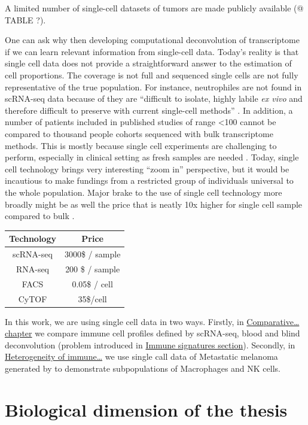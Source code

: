 \documentclass[12pt,]{book}
\theoremstyle{definition}
\theoremstyle{definition}
\theoremstyle{definition}
\theoremstyle{remark}
\begin{document}
A limited number of single-cell datasets of tumors are made publicly
available (@ TABLE ?).

One can ask why then developing computational deconvolution of
transcriptome if we can learn relevant information from single-cell
data. Today's reality is that single cell data does not provide a
straightforward answer to the estimation of cell proportions. The
coverage is not full and sequenced single cells are not fully
representative of the true population. For instance, neutrophiles are
not found in scRNA-seq data because of they are ``difficult to isolate,
highly labile \emph{ex vivo} and therefore difficult to preserve with
current single-cell methods'' \citep{Schelker2017}. In addition, a
number of patients included in published studies of range \textless{}100
cannot be compared to thousand people cohorts sequenced with bulk
transcriptome methods. This is mostly because single cell experiments
are challenging to perform, especially in clinical setting as fresh
samples are needed \citep{Schelker2017}. Today, single cell technology
brings very interesting ``zoom in'' perspective, but it would be
incautious to make fundings from a restricted group of individuals
universal to the whole population. Major brake to the use of single cell
technology more broadly might be as well the price that is neatly 10x
higher for single cell sample compared to bulk \citep{Cedar2018}.

\begin{longtable}[]{@{}cc@{}}
\toprule
Technology & Price\tabularnewline
\midrule
\endhead
scRNA-seq & 3000\$ / sample\tabularnewline
RNA-seq & 200 \$ / sample\tabularnewline
FACS & 0.05\$ / cell\tabularnewline
CyTOF & 35\$/cell\tabularnewline
\bottomrule
\end{longtable}

In this work, we are using single cell data in two ways. Firstly, in
\protect\hyperlink{results}{Comparative\ldots{} chapter} we compare
immune cell profiles defined by scRNA-seq, blood and blind deconvolution
(problem introduced in \protect\hyperlink{immune-signatures}{Immune
signatures section}). Secondly, in \protect\hyperlink{map}{Heterogeneity
of immune\ldots{}} we use single call data of Metastatic melanoma
generated by \citet{Tirosh2016} to demonstrate subpopulations of
Macrophages and NK cells.

\hypertarget{biological-dimension-of-the-thesis}{%
\section{Biological dimension of the
thesis}\label{biological-dimension-of-the-thesis}}
\end{document}
